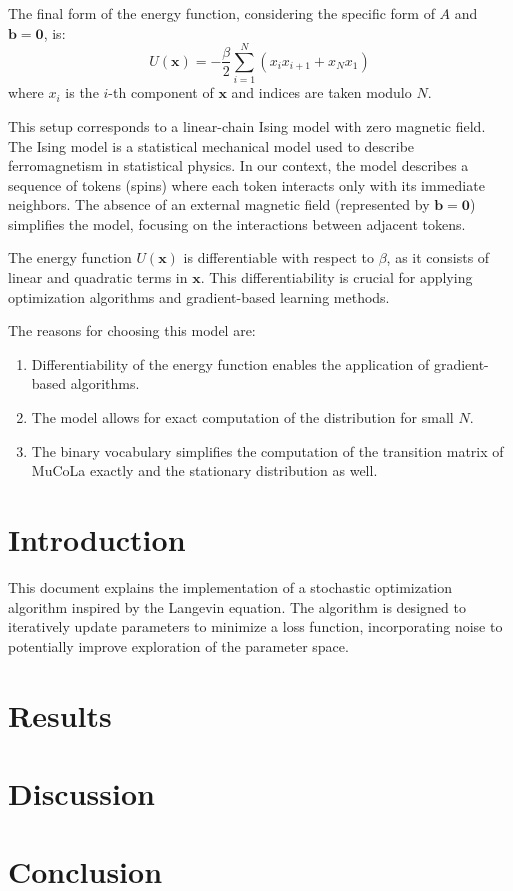 \documentclass{article}
\begin{document}
The final form of the energy function, considering the specific form of \(A\) and \(\boldsymbol{b} = \boldsymbol{0}\), is:
\[ U(\boldsymbol{x}) = - \frac{\beta}{2} \sum_{i=1}^{N} (x_i x_{i+1} + x_{N} x_{1}) \]
where \(x_i\) is the \(i\)-th component of \(\boldsymbol{x}\) and indices are taken modulo \(N\).

This setup corresponds to a linear-chain Ising model with zero magnetic field. The Ising model is a statistical mechanical model used to describe ferromagnetism in statistical physics. In our context, the model describes a sequence of tokens (spins) where each token interacts only with its immediate neighbors. The absence of an external magnetic field (represented by \(\boldsymbol{b} = \boldsymbol{0}\)) simplifies the model, focusing on the interactions between adjacent tokens.

The energy function \(U(\boldsymbol{x})\) is differentiable with respect to \(\beta\), as it consists of linear and quadratic terms in \(\boldsymbol{x}\). This differentiability is crucial for applying optimization algorithms and gradient-based learning methods.

The reasons for choosing this model are:
\begin{enumerate}
    \item Differentiability of the energy function enables the application of gradient-based algorithms.
    \item The model allows for exact computation of the distribution for small \(N\).
    \item The binary vocabulary simplifies the computation of the transition matrix of MuCoLa exactly and the stationary distribution as well.
\end{enumerate}

\section{Introduction}

This document explains the implementation of a stochastic optimization algorithm inspired by the Langevin equation. The algorithm is designed to iteratively update parameters to minimize a loss function, incorporating noise to potentially improve exploration of the parameter space.



\section{Results}


\section{Discussion}


\section{Conclusion}





\end{document}
